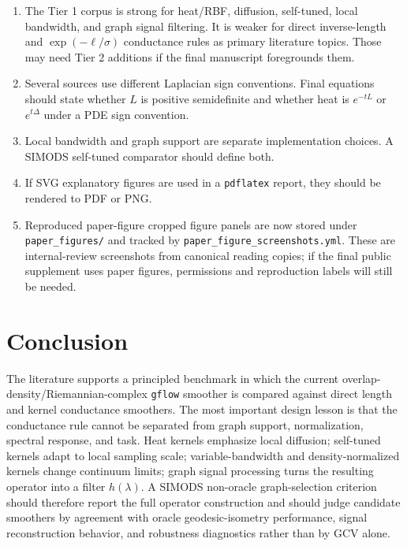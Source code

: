 \documentclass[11pt]{article}
\newcommand{\code}[1]{\texttt{#1}}
\begin{document}
\begin{enumerate}
  \item The Tier 1 corpus is strong for heat/RBF, diffusion, self-tuned, local
    bandwidth, and graph signal filtering.  It is weaker for direct
    inverse-length and \(\exp(-\ell/\sigma)\) conductance rules as primary
    literature topics.  Those may need Tier 2 additions if the final
    manuscript foregrounds them.
  \item Several sources use different Laplacian sign conventions.  Final
    equations should state whether \(L\) is positive semidefinite and whether
    heat is \(e^{-tL}\) or \(e^{t\Delta}\) under a PDE sign convention.
  \item Local bandwidth and graph support are separate implementation choices.
    A SIMODS self-tuned comparator should define both.
  \item If SVG explanatory figures are used in a \code{pdflatex} report, they
    should be rendered to PDF or PNG.
  \item Reproduced paper-figure cropped figure panels are now stored under
    \code{paper\_figures/} and tracked by
    \code{paper\_figure\_screenshots.yml}.  These are internal-review
    screenshots from canonical reading copies; if the final public supplement
    uses paper figures, permissions and reproduction labels will still be
    needed.
\end{enumerate}

\section{Conclusion}

The literature supports a principled benchmark in which the current
overlap-density/Riemannian-complex \code{gflow} smoother is compared against
direct length and kernel conductance smoothers.  The most important design
lesson is that the conductance rule cannot be separated from graph support,
normalization, spectral response, and task.  Heat kernels emphasize local
diffusion; self-tuned kernels adapt to local sampling scale; variable-bandwidth
and density-normalized kernels change continuum limits; graph signal processing
turns the resulting operator into a filter \(h(\lambda)\).  A SIMODS
non-oracle graph-selection criterion should therefore report the full operator
construction and should judge candidate smoothers by agreement with oracle
geodesic-isometry performance, signal reconstruction behavior, and robustness
diagnostics rather than by GCV alone.
\end{document}
